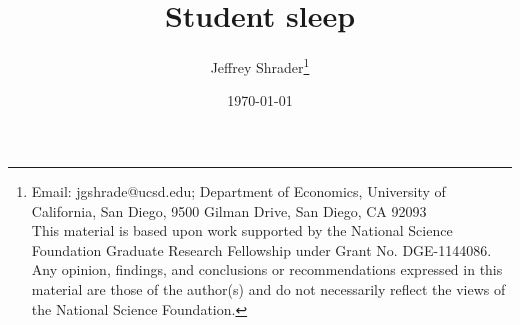 \documentclass[letterpaper,12pt]{article}
\theoremstyle{definition}
\begin{document}
\author{
Jeffrey Shrader\thanks{Email: jgshrade@ucsd.edu; Department of Economics, University of California, San Diego, 9500 Gilman Drive, San Diego, CA 92093 \\ This material is based upon work supported by the National Science Foundation Graduate Research Fellowship under Grant No. DGE-1144086. Any opinion, findings, and conclusions or recommendations expressed in this material are those of the author(s) and do not necessarily reflect the views of the National Science Foundation.}
}
\title{Student sleep}
\date{\normalsize \today}

 

\maketitle




\newpage 
\clearpage


\end{document}
